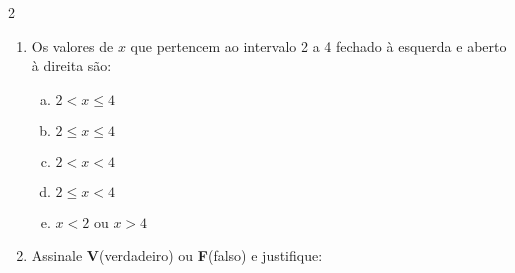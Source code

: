 \documentclass[a4paper,14pt]{article}
\begin{document}
\begin{multicols}{2}
\begin{enumerate}
\begin{enumerate}[a)]
    	        \item $\{x \in \mathbb{\textbf{R}}:7 \leq x < 9\}$ \\\\\\\\\\\\
    	        \item $\{x \in \mathbb{\textbf{R}}:-6 \leq x \leq -4\}$ \\\\\\\\\\\\
    	        \item $\{x \in \mathbb{\textbf{R}}|x < 0\}$ \\\\\\\\\\\\
    	        \item $\{x \in \mathbb{\textbf{R}}$ tal que $2 > x > -2\}$ \\\\\\\\\\\\
    	        \item $\{x \in \mathbb{\textbf{R}}$ t.q. $-7 < x \leq 13\}$ \\\\\\\\\\\\
    	    \end{enumerate}
            \item Os valores de $x$ que pertencem ao intervalo 2 a 4 fechado à esquerda e aberto à direita são:
             \begin{enumerate}[a)]
             	\item $2 < x \leq 4$ 
             	\item $2 \leq x \leq 4$
             	\item $2 < x < 4$
             	\item $2 \leq x < 4$
             	\item $x < 2$ ou $x > 4$
             \end{enumerate}
             \item Assinale \textbf{V}(verdadeiro) ou \textbf{F}(falso) e justifique:

\end{enumerate}
\end{multicols}
\end{document}
